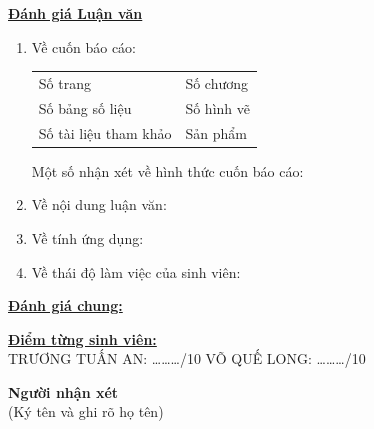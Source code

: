\documentclass[12pt,a4paper]{article}
\begin{document}
\noindent \underline{\textbf{Đánh giá Luận văn}}
\begin{enumerate}[label=\arabic*., leftmargin=0.6cm]
    \item \small Về cuốn báo cáo: \\
    \vspace{-0.2cm}
    \begin{tabular}{p{} p{}}
        Số trang \dotfill & Số chương \dotfill \\
        Số bảng số liệu \dotfill & Số hình vẽ \dotfill \\
        Số tài liệu tham khảo \dotfill & Sản phẩm \dotfill
    \end{tabular}
    
    \vspace{0.2cm}
    Một số nhận xét về hình thức cuốn báo cáo: \dotfill \\
    \dotfill
    
    \vspace{0.2cm}
    \item Về nội dung luận văn: \dotfill \\
    \dotfill
    
    \vspace{0.2cm}
    \item Về tính ứng dụng: \dotfill \\
    \dotfill
    
    \vspace{0.2cm}
    \item Về thái độ làm việc của sinh viên: \dotfill \\
    \dotfill
\end{enumerate}

\vspace{0.2cm}

\noindent \underline{\textbf{Đánh giá chung:}} \dotfill \\
\dotfill

\vspace{0.3cm}

\noindent \underline{\textbf{Điểm từng sinh viên:}} \\[0.1cm]
\small TRƯƠNG TUẤN AN: \dots\dots\dots/10 \hfill VÕ QUẾ LONG: \dots\dots\dots/10 \hspace{2cm}

\vspace{0.3cm}

\hfill
\begin{minipage}[t]{0.45\textwidth}
    \centering
    \textbf{Người nhận xét} \\
    \vspace{0.1cm}
    (Ký tên và ghi rõ họ tên)
\end{minipage}
\end{document}
